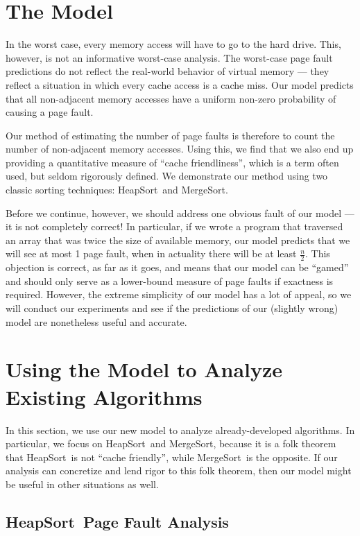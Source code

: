 \documentclass{acmtrans2m}
\newcommand{\heapsort}{{\sc HeapSort}}
\newcommand{\mergesort}{{\sc MergeSort}}
\begin{document}
\section{The Model}
\label{model}

In the worst case, every memory access will have to go to the hard drive.
This, however, is not an informative worst-case analysis.  The worst-case page
fault predictions do not reflect the real-world behavior of virtual memory ---
they reflect a situation in which every cache access is a cache miss. Our model
predicts that all non-adjacent memory accesses have a uniform non-zero
probability of causing a page fault.

Our method of estimating the number of page faults is therefore to count the
number of non-adjacent memory accesses.  Using this, we find that we also end
up providing a quantitative measure of ``cache friendliness'', which is a term
often used, but seldom rigorously defined.  We demonstrate our method using two
classic sorting techniques: \heapsort\ and \mergesort.

Before we continue, however, we should address one obvious fault of our model
--- it is not completely correct!  In particular, if we wrote a program that
traversed an array that was twice the size of available memory, our model
predicts that we will see at most 1 page fault, when in actuality there will be
at least $\frac{n}{2}$.  This objection is correct, as far as it goes, and
means that our model can be ``gamed'' and should only serve as a lower-bound
measure of page faults if exactness is required.  However, the extreme
simplicity of our model has a lot of appeal, so we will conduct our experiments
and see if the predictions of our (slightly wrong) model are nonetheless useful
and accurate.

\section{Using the Model to Analyze Existing Algorithms}
\label{analysis}

In this section, we use our new model to analyze already-developed algorithms.
In particular, we focus on \heapsort\ and \mergesort, because it is a folk
theorem that \heapsort\ is not ``cache friendly'', while \mergesort\ is the
opposite.  If our analysis can concretize and lend rigor to this folk theorem,
then our model might be useful in other situations as well.

\subsection{\heapsort\ Page Fault Analysis} 
\end{document}
